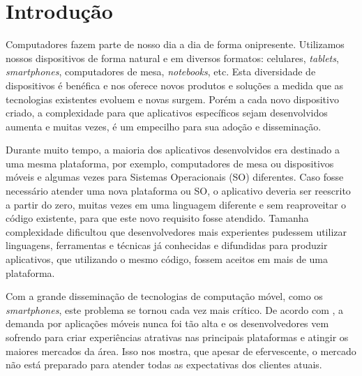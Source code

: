 \section{\esp Introdução}

Computadores fazem parte de nosso dia a dia de forma onipresente. Utilizamos nossos dispositivos de forma natural e em diversos formatos: celulares, \textit{tablets}, \textit{smartphones}, computadores de mesa, \textit{notebooks}, etc. Esta diversidade de dispositivos é benéfica e nos oferece novos produtos e soluções a medida que as tecnologias existentes evoluem e novas surgem. Porém a cada novo dispositivo criado, a complexidade para que aplicativos específicos sejam desenvolvidos aumenta e muitas vezes, é um empecilho para sua adoção e disseminação.

Durante muito tempo, a maioria dos aplicativos desenvolvidos era destinado a uma mesma plataforma, por exemplo, computadores de mesa ou dispositivos móveis e algumas vezes para Sistemas Operacionais (SO) diferentes. Caso fosse necessário atender uma nova plataforma ou SO, o aplicativo deveria ser reescrito a partir do zero, muitas vezes em uma linguagem diferente e sem reaproveitar o código existente, para que este novo requisito fosse atendido. Tamanha complexidade dificultou que desenvolvedores mais experientes pudessem utilizar linguagens, ferramentas e técnicas já conhecidas e difundidas para produzir aplicativos, que utilizando o mesmo código, fossem aceitos em mais de uma plataforma.

Com a grande disseminação de tecnologias de computação móvel, como os \textit{smartphones}, este problema se tornou cada vez mais crítico. De acordo com \cite{ionEdge}, a demanda por aplicações móveis nunca foi tão alta e os desenvolvedores vem sofrendo para criar experiências atrativas nas principais plataformas e atingir os maiores mercados da área. Isso nos mostra, que apesar de efervescente, o mercado não está preparado para atender todas as expectativas dos clientes atuais.

